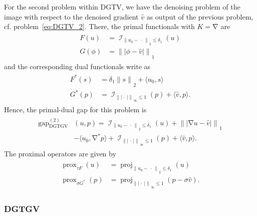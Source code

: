 \documentclass[twocolumn,envcountsame]{svjour3}
\newcommand{\norm}[2][]{{\|{#2}\|_{}}_{#1}}
\newcommand{\abs}[1]{|#1|}
\newcommand{\scp}[2]{\langle #1,#2\rangle}
\newcommand{\dummy}{\,\cdot\,}
\DeclareMathOperator{\ind}{\mathcal{I}}
\DeclareMathOperator{\prox}{prox}
\DeclareMathOperator{\proj}{proj}
\DeclareMathOperator{\gap}{gap}
\DeclareMathOperator{\grad}{\nabla}
\DeclareMathOperator{\DGTGV}{DGTGV}
\begin{document}
For the second problem within DGTV, we have the denoising problem 
of the image with respect to the denoised gradient $\widehat{v}$ 
as output of 
the previous problem, cf. problem~\eqref{eq:DGTV_2}.
There, the primal functionals with $K = \grad$ are
\begin{align}\label{eq:primalDGTVu}
\begin{split}
	F(u)   &= \ind_{\norm[2]{u_0 - \dummy}\leq\delta_1}(u)\\
	G(\phi)&= \norm[1]{\abs{\phi - \widehat{v}}}
\end{split}
\end{align}
and the corresponding dual functionals write as 
\begin{align}\label{eq:dualDGTVu}
\begin{split}
	F^*(s) &= 	\delta_1\norm[2]{s} + \scp{u_0}{s}\\
	G^*(p) &= 	\ind_{\norm[\infty]{\abs{\dummy}}\leq 1}(p)
				+ \scp{\widehat{v}}{p}.
\end{split}
\end{align}
Hence, the primal-dual gap for this problem is
\begin{align}\label{eq:gapDGTVu}
\begin{split}
	\gap_{\DGTGV}^{(2)}&(u,p)
	= 	\ind_{\norm[2]{u_0-\dummy}\leq \delta_1}(u)
		+ \norm[1]{\abs{\grad u - \widehat{v}}}\\
		&- \scp{u_0}{\grad^* p}
		+ \ind_{\norm[\infty]{\abs{\dummy}}\leq 1}(p)
		+ \scp{\widehat{v}}{p}.
\end{split}	
\end{align}
The proximal operators are given by
\begin{align}\label{eq:proxDGTVu}
\begin{split}
	\prox_{\tau F}(u) 
	&= \proj_{\norm[2]{u_0 - \dummy}\leq \delta_1}(u)\\
	\prox_{\sigma G^*}(p) 
	&= \proj_{\norm[\infty]{\abs{\dummy}}\leq 1}(
		p - \sigma \widehat{v}).
\end{split}	
\end{align}

\subsubsection{DGTGV}
\label{subsec:DGTGV}
\end{document}
